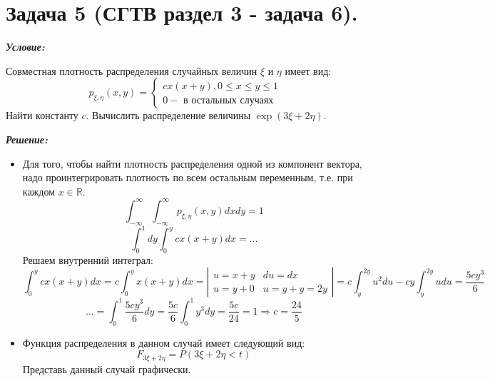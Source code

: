 \section*{Задача 5 (СГТВ раздел 3 - задача 6).}

\noindent\textit{\textbf{Условие:}}

Совместная плотность распределения случайных величин $\xi$ и $\eta$ имеет вид:
\[
p_{\xi, \eta} (x, y) =
\begin{cases}
	c x(x+y), 0 \le x \le y \le 1 \\
	0 - \text{ в остальных случаях}
\end{cases}
\]
Найти константу $c$. Вычислить распределение величины $\exp (3 \xi + 2 \eta)$.

\noindent\textit{\textbf{Решение:}}

\begin{itemize}
	\item  Для того, чтобы найти плотность распределения одной из компонент вектора, надо проинтегрировать плотность по всем остальным переменным, т.е. при каждом $x \in \mathbb{R}$.
	\[ \int_{- \infty}^{\infty} \int_{- \infty}^{\infty} p_{\xi, \eta} (x, y) dxdy = 1 \]
	\[ \int_{0}^{1} dy \int_{0}^{y} c x(x+y) dx = \dots \]
	Решаем внутренний интеграл:
	\[ \int_{0}^{y} c x(x+y) dx = c \int_{0}^{y} x(x+y) dx =
	\left| \begin{smallmatrix} u = x+y & du = dx \\ u = y + 0 & u = y+y=2y \end{smallmatrix} \right|
	= c \int_{y}^{2y} u^2 du - c y \int_{y}^{2y} udu = \frac{5cy^3}{6}
	\]
	\[ \dots = \int_{0}^{1} \frac{5cy^3}{6} dy = \frac{5c}{6} \int_{0}^{1} y^3 dy = \frac{5c}{24} = 1 \Rightarrow c = \frac{24}{5} \]
	\item Функция распределения в данном случай имеет следующий вид:
	\[ F_{3 \xi + 2 \eta} = P(3\xi + 2 \eta < t) \]
	Представь данный случай графически.
	\begin{figure}[H]

\end{figure}
\end{itemize}
